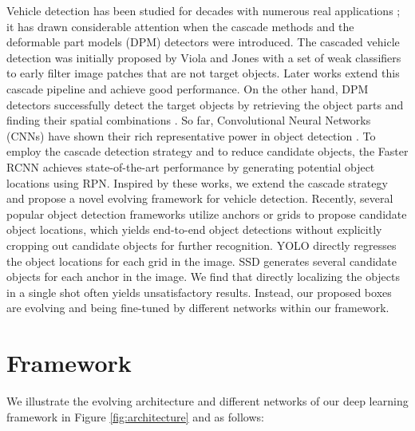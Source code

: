 \documentclass[5pt]{article}
\begin{document}
Vehicle detection has been studied for decades with numerous real applications \cite{song2013discriminatively,feris2015efficient,dollar2014fast}; it has drawn considerable attention when the cascade methods \cite{dollar2014fast} and the deformable part models (DPM) detectors \cite{felzenszwalb2010object} were introduced. The cascaded vehicle detection was initially proposed by Viola and Jones \cite{viola2001rapid} %
with a set of weak classifiers to early filter image patches that are not target objects. Later works \cite{li2015convolutional,qin2016joint,zhang2016joint} extend this cascade pipeline and achieve good performance. On the other hand, DPM detectors successfully detect the target objects by retrieving the object parts and finding their spatial combinations \cite{song2013discriminatively}.
So far, Convolutional Neural Networks (CNNs) have shown their rich representative power in object detection \cite{girshick2014rich}. To employ the cascade detection strategy and to reduce candidate objects, the Faster RCNN \cite{renNIPS15fasterrcnn} achieves state-of-the-art performance by generating potential object locations using RPN. Inspired by these works, we extend the cascade strategy and propose a novel evolving framework for vehicle detection.
Recently, several popular object detection frameworks utilize anchors or grids to propose candidate object locations, which yields end-to-end object detections without explicitly cropping out candidate objects for further recognition. YOLO \cite{redmon2015you} directly regresses the object locations for each grid in the image. SSD \cite{liu2015ssd} generates several candidate objects for each anchor in the image. We find that directly localizing the objects in a single shot often yields unsatisfactory results. Instead, our proposed boxes are evolving and being fine-tuned by different networks within our framework.

\section{Framework}
We illustrate the evolving architecture and different networks of our deep learning framework in Figure \ref{fig:architecture} and as follows:
\end{document}
